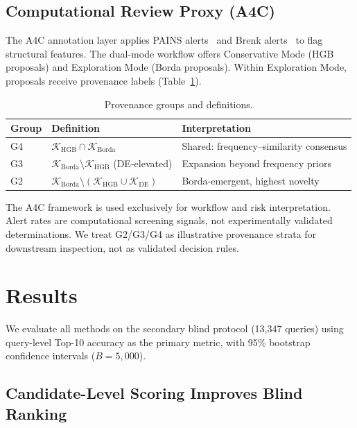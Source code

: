 \documentclass[12pt,letterpaper]{article}
\begin{document}
\subsection{Computational Review Proxy (A4C)}

The A4C annotation layer applies PAINS alerts~\cite{baell2010new} and Brenk alerts~\cite{brenk2008lessons} to flag structural features. The dual-mode workflow offers Conservative Mode (HGB proposals) and Exploration Mode (Borda proposals). Within Exploration Mode, proposals receive provenance labels (Table~\ref{tab:M5}).

\begin{table}[ht]
\centering
\caption{Provenance groups and definitions.}
\label{tab:M5}
\begin{tabular}{lll}
\toprule
Group & Definition & Interpretation \\
\midrule
G4 & $\mathcal{K}_{\mathrm{HGB}} \cap \mathcal{K}_{\mathrm{Borda}}$ & Shared: frequency--similarity consensus \\
G3 & $\mathcal{K}_{\mathrm{Borda}} \setminus \mathcal{K}_{\mathrm{HGB}}$ (DE-elevated) & Expansion beyond frequency priors \\
G2 & $\mathcal{K}_{\mathrm{Borda}} \setminus (\mathcal{K}_{\mathrm{HGB}} \cup \mathcal{K}_{\mathrm{DE}})$ & Borda-emergent, highest novelty \\
\bottomrule
\end{tabular}
\end{table}

The A4C framework is used exclusively for workflow and risk interpretation. Alert rates are computational screening signals, not experimentally validated determinations. We treat G2/G3/G4 as illustrative provenance strata for downstream inspection, not as validated decision rules.


\section{Results}

We evaluate all methods on the secondary blind protocol (13,347 queries) using query-level Top-10 accuracy as the primary metric, with 95\% bootstrap confidence intervals ($B=5{,}000$).

\subsection{Candidate-Level Scoring Improves Blind Ranking}
\end{document}
